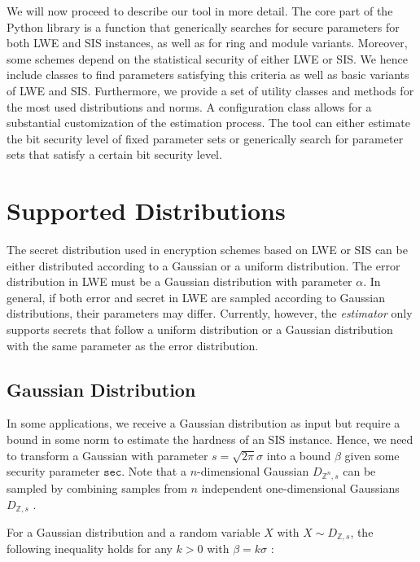 We will now proceed to describe our tool in more detail. The core part of the Python library is a function that generically searches for secure parameters for both LWE and SIS instances, as well as for ring and module variants. Moreover, some schemes depend on the statistical security of either LWE or SIS. We hence include classes to find parameters satisfying this criteria as well as basic variants of LWE and SIS. %
Furthermore, we provide a set of utility classes and methods for the most used distributions and norms.
A configuration class allows for a substantial customization of the estimation process.
The tool can either estimate the bit security level of fixed parameter sets or generically search for parameter sets that satisfy a certain bit security level.

\section{Supported Distributions} \label{sec:supported-distributions}%
The secret distribution used in encryption schemes based on LWE or SIS can be either distributed according to a Gaussian or a uniform distribution. The error distribution in LWE must be a Gaussian distribution with parameter $\alpha$. In general, if both error and secret in LWE are sampled according to Gaussian distributions, their parameters may differ. Currently, however, the \textit{estimator} only supports secrets that follow a uniform distribution or a Gaussian distribution with the same parameter as the error distribution.

\subsection{Gaussian Distribution}\label{sec:gaussian-bounds}
In some applications, we receive a Gaussian distribution as input but require a bound in some norm to estimate the hardness of an SIS instance. Hence, we need to transform a Gaussian with parameter $s  = \sqrt{2 \pi} \sigma$ into a bound $\beta$ given some security parameter $\texttt{sec}$. Note that a $n$-dimensional Gaussian $D_{\mathbb{Z}^n, s}$ can be sampled by combining samples from $n$ independent one-dimensional Gaussians $D_{\mathbb{Z}, s}$ \cite{GJS15}. %

For a Gaussian distribution and a random variable $X$ with $X \sim D_{\mathbb{Z}, s}$, the following inequality holds for any $k>0$ with $\beta = k\sigma$ \cite[Lemma~4.4]{Lyu12}: %


